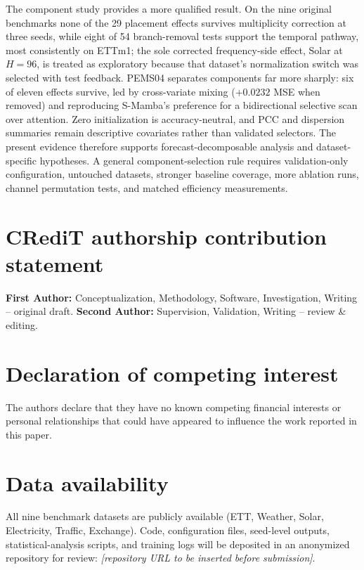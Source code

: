\documentclass[review,12pt]{elsarticle}
\begin{document}
The component study provides a more qualified result. On the nine original
benchmarks none of the 29 placement effects survives multiplicity correction
at three seeds, while eight of 54 branch-removal tests support the temporal
pathway, most consistently on ETTm1; the sole corrected frequency-side
effect, Solar at $H{=}96$, is treated as exploratory because that dataset's
normalization switch was selected with test feedback. PEMS04 separates
components far more sharply: six of eleven effects survive, led by
cross-variate mixing ($+0.0232$ MSE when removed) and reproducing S-Mamba's
preference for a bidirectional selective scan over attention. Zero
initialization is accuracy-neutral, and PCC and dispersion summaries remain
descriptive covariates rather than validated selectors. The present evidence
therefore supports forecast-decomposable analysis and dataset-specific
hypotheses. A
general component-selection rule requires validation-only configuration,
untouched datasets, stronger baseline coverage, more ablation runs, channel
permutation tests, and matched efficiency measurements.



\section*{CRediT authorship contribution statement}
\textbf{First Author:} Conceptualization, Methodology, Software,
Investigation, Writing -- original draft. \textbf{Second Author:}
Supervision, Validation, Writing -- review \& editing.

\section*{Declaration of competing interest}
The authors declare that they have no known competing financial interests
or personal relationships that could have appeared to influence the work
reported in this paper.

\section*{Data availability}
All nine benchmark datasets are publicly available (ETT, Weather, Solar,
Electricity, Traffic, Exchange). Code, configuration files, seed-level
outputs, statistical-analysis scripts, and training logs will be deposited
in an anonymized repository for review:
\textit{[repository URL to be inserted before submission]}.
\end{document}
